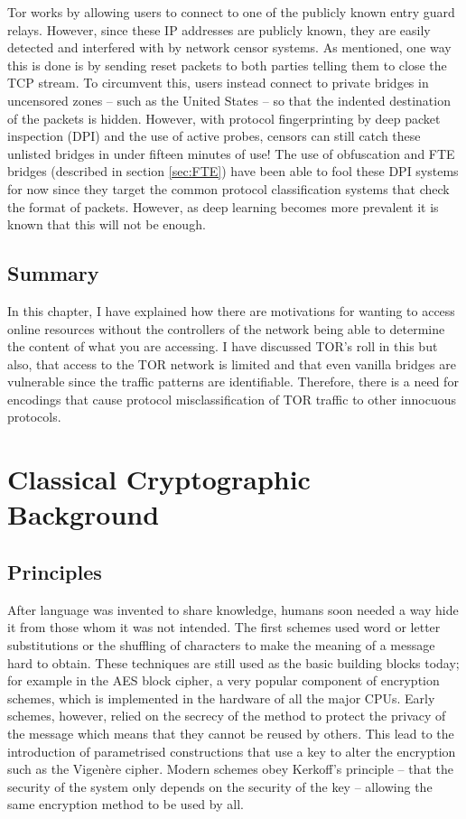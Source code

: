 \documentclass[ %
                    author={Samuel Russell},
                supervisor={Prof. Bogdan Warinschi},
                    degree={MEng},
                     title={Innocuous Ciphertexts},
                  subtitle={The DE-CENSOR Scheme},
                      type={research},
                      year={2018} ]{dissertation}
\begin{document}
Tor works by allowing users to connect to one of the publicly known entry guard relays. However, since these IP addresses are publicly known, they are easily detected and interfered with by network censor systems. As mentioned, one way this is done is by sending reset packets to both parties telling them to close the TCP stream.
To circumvent this, users instead connect to private bridges in uncensored zones -- such as the United States -- so that the indented destination of the packets is hidden. However, with protocol fingerprinting by deep packet inspection (DPI) and the use of active probes, censors can still catch these unlisted bridges in under fifteen minutes of use!
The use of obfuscation and FTE bridges (described in section \ref{sec:FTE}) have been able to fool these DPI systems for now since they target the common protocol classification systems that check the format of packets. However, as deep learning becomes more prevalent it is known that this will not be enough.

\section{Summary}

In this chapter, I have explained how there are motivations for wanting to access online resources without the controllers of the network being able to determine the content of what you are accessing. I have discussed TOR's roll in this but also, that access to the TOR network is limited and that even vanilla bridges are vulnerable since the traffic patterns are identifiable. Therefore, there is a need for encodings that cause protocol misclassification of TOR traffic to other innocuous protocols.


\chapter{Classical Cryptographic Background}
\label{chap:technical}

\section{Principles}

After language was invented to share knowledge, humans soon needed a way hide it from those whom it was not intended. The first schemes used word or letter substitutions or the shuffling of characters to make the meaning of a message hard to obtain.
These techniques are still used as the basic building blocks today; for example in the AES block cipher, a very popular component of encryption schemes, which is implemented in the hardware of all the major CPUs.
Early schemes, however, relied on the secrecy of the method to protect the privacy of the message which means that they cannot be reused by others.
This lead to the introduction of parametrised constructions that use a key to alter the encryption such as the Vigen\`ere cipher.
Modern schemes obey Kerkoff's principle -- that the security of the system only depends on the security of the key -- allowing the same encryption method to be used by all.
\end{document}
